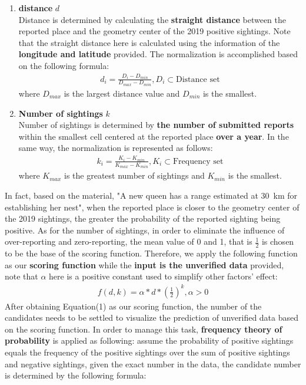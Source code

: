 \documentclass{mcmthesis}
\begin{document}
		\begin{enumerate}
		\item \textbf{distance} $d$\\
		Distance is determined by calculating the \textbf{straight distance} between the reported place and the geometry center of the 2019 positive sightings. Note that the straight distance here is calculated using the information of the \textbf{longitude and latitude} provided. The normalization is accomplished based on the following formula:
		\begin{align*}
			d_i = \frac{D_i-D_{min}}{D_{max}-D_{min}}, D_i \subset \text{Distance set} 
		\end{align*}
		where $D_{max}$ is the largest distance value and $D_{min}$ is the smallest.
		\item \textbf{Number of sightings} $k$ \\
		Number of sightings is determined by \textbf{the number of submitted reports} within the smallest cell centered at the reported place \textbf{over a year}. In the same way, the normalization is represented as follows:
			\begin{align*}
			k_i = \frac{K_i-K_{min}}{K_{max}-K_{min}}, K_i \subset \text{Frequency set} 
		\end{align*}
		where $K_{max}$ is the greatest number of sightings and $K_{min}$ is the smallest.
	\end{enumerate}
	In fact, based on the material, "A new queen has a range estimated at 30 km for establishing her nest", when the reported place is closer to the geometry center of the 2019 sightings, the greater the probability of the reported sighting being positive. As for the number of sightings, in order to eliminate the influence of over-reporting and zero-reporting, the mean value of 0 and 1, that is $\frac{1}{2}$ is chosen to be the base of the scoring function. Therefore, we apply the following function as our \textbf{scoring function} while the \textbf{input is the unverified data} provided, note that $\alpha$ here is a positive constant used to simplify other factors' effect:
	\begin{align}
		f(d,k) = \alpha*d*(\frac{1}{2})^{k}, \alpha > 0
	\end{align}
	\quad After obtaining Equation(1) as our scoring function, the number of the candidates needs to be settled to visualize the prediction of unverified data based on the scoring function. In order to manage this task, \textbf{frequency theory of probability} is applied as following: assume the probability of positive sightings equals the frequency of the positive sightings over the sum of positive sightings and negative sightings, given the exact number in the data, the candidate number is determined by the following formula:
\end{document}
